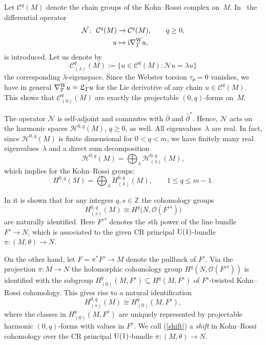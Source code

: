 \documentclass[pdftex]{sigma}
\numberwithin{equation}{section}
\newcommand{\ZZ}{\mathbb{Z}}
\begin{document}
Let $\mathcal{C}^q(M)$ denote the chain groups of the Kohn--Rossi complex on~$M$. In~\cite{Tan} the differential operator
\begin{align*}
\mathcal{N}\colon \ \mathcal{C}^q(M)&\to \mathcal{C}^q(M),\qquad q\geq 0,\\
u&\mapsto {\rm i}\nabla^{\rm W}_Tu,
\end{align*}
is introduced. Let us denote by
\[
\mathcal{C}_{(\lambda)}^q(M) := \big\{u\in \mathcal{C}^q(M)\colon \mathcal{N}u= \lambda u\big\}
\]
the corresponding $\lambda$-eigenspace.
Since the Webster torsion $\tau_\theta=0$ vanishes, we have in general
$\nabla^{\rm W}_Tu = \mathfrak{L}_Tu$ for the Lie derivative of any chain $u\in\mathcal{C}^q(M)$. This shows that
$\mathcal{C}_{(0)}^q(M)$ are exactly the projectable $(0,q)$-forms on~$M$.

The operator $\mathcal{N}$ is self-adjoint and commutes with $\bar{\partial}$ and $\bar{\partial}^*$.
Hence, $\mathcal{N}$ acts on the harmonic spaces $\mathcal{H}^{0,q}(M)$, $q\geq 0$, as well. All eigenvalues~$\lambda$ are real.
In fact, since $\mathcal{H}^{0,q}(M)$ is finite dimensional for $0<q<m$, we have finitely many real eigenvalues~$\lambda$ and a direct sum decomposition
\[\mathcal{H}^{0,q}(M) = \bigoplus_{\lambda} \mathcal{H}_{(\lambda)}^{0,q}(M) ,
\]
which implies for the Kohn--Rossi groups:
\[
H^{0,q}(M) = \bigoplus_{\lambda} H_{(\lambda)}^{0,q}(M),\qquad 1\leq q\leq m-1 .
\]

In \cite{Tan} it is shown that for any integers $q,s\in\ZZ$ the cohomology groups
\begin{equation*}%
H_{(s)}^{0,q}(M) \cong H^q\big(N,\mathcal{O}(F'^s)\big)
\end{equation*}
are naturally identified. Here $F'^s$ denotes the $s$th power of the line bundle $F'\to N$, which is associated to
the given CR principal ${\rm U}(1)$-bundle $\pi\colon (M,\theta)\to N$.

On the other hand, let $F=\pi^*F'\to M$ denote the pullback of $F'$.
Via the projection $\pi\colon M\to N$ the holomorphic cohomology group $H^q(N,\mathcal{O}(F'^s))$ is identified with
the subgroup $H_{(0)}^{q}(M,F^s)\subseteq H^{q}(M,F^s)$ of $F^s$-twisted Kohn--Rossi cohomology. This gives rise to a natural identification
\begin{equation}\label{shift}
H_{(s)}^{0,q}(M) \cong H^q_{(0)}(M,F^s) ,
\end{equation}
where the classes in $H^q_{(0)}(M,F^s)$ are uniquely represented by projectable harmonic $(0,q)$-forms
with values in $F^s$. We call (\ref{shift}) a {\em shift} in Kohn--Rossi cohomology over the CR principal ${\rm U}(1)$-bundle $\pi\colon (M,\theta)\to N$.
\end{document}
